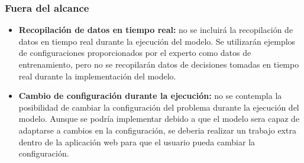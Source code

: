 \subsubsection{Fuera del alcance}
\begin{itemize}
    \item \textbf{Recopilación de datos en tiempo real:} no se incluirá la recopilación de datos en tiempo 
    real durante la ejecución del modelo. Se utilizarán ejemplos de configuraciones proporcionados 
    por el experto como datos de entrenamiento, pero no se recopilarán datos de decisiones tomadas 
    en tiempo real durante la implementación del modelo.
    \item \textbf{Cambio de configuración durante la ejecución:} no se contempla la posibilidad de cambiar
    la configuración del problema durante la ejecución del modelo. Aunque se podría implementar debido
    a que el modelo sera capaz de adaptarse a cambios en la configuración, se deberia realizar un 
    trabajo extra dentro de la aplicación web para que el usuario pueda cambiar la configuración.
\end{itemize}

\pagebreak